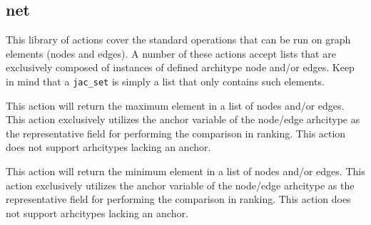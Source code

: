 \subsection{net}
\par
This library of actions cover the standard operations that can be
run on graph elements (nodes and edges). A number of these actions
accept lists that are exclusively composed of instances of defined
architype node and/or edges. Keep in mind that a \lstinline{jac_set}
is simply a list that only contains such elements.
{This action will return the maximum element in a list of nodes
and/or edges. This action exclusively utilizes the anchor variable
of the node/edge arhcitype as the representative field for
performing the  comparison in ranking. This action does not support
arhcitypes lacking an anchor.\vspace{4mm}\par
{}\vspace{4mm}\par
{}}
{This action will return the minimum element in a list of nodes
and/or edges. This action exclusively utilizes the anchor variable
of the node/edge arhcitype as the representative field for
performing the  comparison in ranking. This action does not support
arhcitypes lacking an anchor.\vspace{4mm}\par
{}\vspace{4mm}\par
{}}
